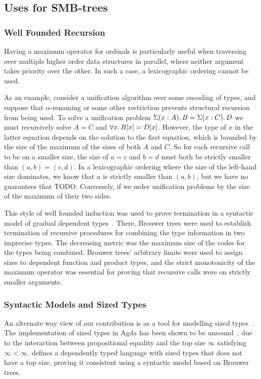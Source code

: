 \subsection{Uses for SMB-trees}

\subsubsection{Well Founded Recursion}

Having a maximum operator for ordinals is particularly useful when traversing over multiple higher order
data structures in parallel, where neither argument takes priority over the other.
In such a case, a lexicographic ordering cannot be used.


As an example, consider a unification algorithm over some encoding of types, and suppose that $\alpha$-renaming or some other restriction prevents
structural recursion from being used.
To solve a unification problem $ \Sigma(x : A)\ldotp B = \Sigma(x : C)\ldotp D$
we must recursively
solve $A = C$ and $\forall x \ldotp B[x] = D[x]$.
However, the type of $x$ in the latter equation depends on the solution
to the first equation, which is bounded by the size of the maximum of the sizes
of both $A$ and $C$.
So for each recursive call to be on a smaller size,
the size of $a = c$ and $b = d$ must both be strictly smaller than
$(a,b)=(c,d)$. In a lexicographic ordering where the size of the left-hand size
dominates, we know that $a$ is strictly smaller than $(a,b)$, but we have no
guarantees that TODO.
Conversely, if we order unification problems by the size of the maximum of their
two sides.


This style of well founded induction was used to prove termination
in a syntactic model of gradual dependent types~\citep{TODO}. There, Brouwer trees
were used to establish termination of recursive procedures for
combining the type information in two imprecise types.
The decreasing metric was the maximum size of the codes for the types being combined. Brouwer trees' arbitrary limits were used to assign sizes
to dependent function and product types, and the strict monotonicity of the
maximum operator was essential for proving that recursive calls were on
strictly smaller arguments.

\subsubsection{Syntactic Models and Sized Types}

An alternate way view of our contribution is as a tool for modelling sized types~\citep{TODO}.
The implementation of sized types in Agda has been shown to be unsound~\citep{TODO}, due to the interaction
between propositional equality and the top size $\infty$ satisfying $\infty < \infty$.
 defines a dependently typed language with sized types that does not have a top size, proving it consistent
using a syntactic model based on Brouwer trees.

